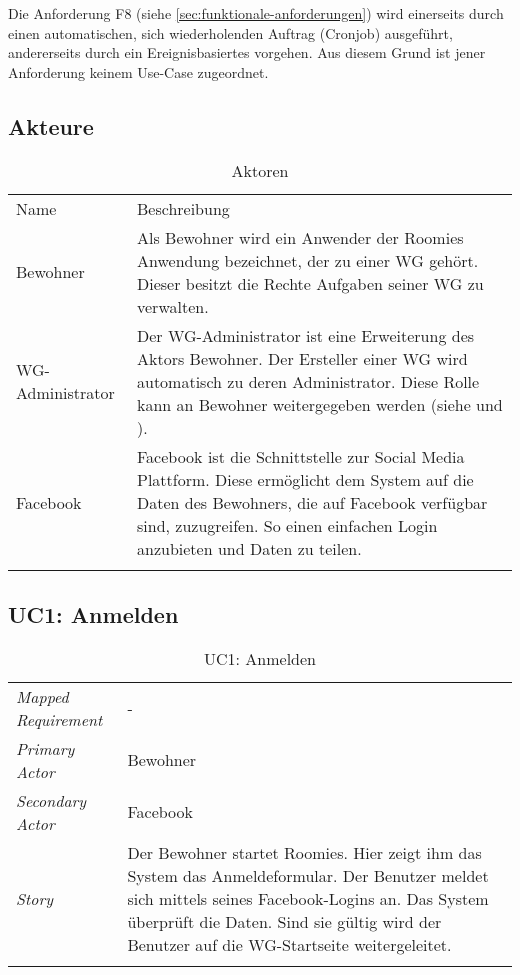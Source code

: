 Die Anforderung F8 (siehe \ref{sec:funktionale-anforderungen}) wird einerseits durch einen automatischen, sich wiederholenden Auftrag (\gls{Cronjob}) ausgeführt, andererseits durch ein Ereignisbasiertes vorgehen. Aus diesem Grund ist jener Anforderung keinem Use-Case zugeordnet.

\subsection{Akteure}
\begin{table}[H]
	\tablestyle
	\tablealtcolored
	\begin{tabularx}{\textwidth}{lX}
		\tableheadcolor
		\tablehead Name &
		\tablehead Beschreibung \tabularnewline
		\tablebody
			Bewohner &
			Als Bewohner wird ein Anwender der Roomies Anwendung bezeichnet, der zu einer WG gehört. \newline
			Dieser besitzt die Rechte Aufgaben seiner WG zu verwalten.
			\tabularnewline
			WG-Administrator &
			Der WG-Administrator ist eine Erweiterung des Aktors Bewohner. Der Ersteller einer WG wird automatisch zu deren Administrator. Diese Rolle kann an Bewohner weitergegeben werden (siehe \nameref{subsec:uc4} und \nameref{subsec:uc10}).
			\tabularnewline
			Facebook &
			Facebook ist die Schnittstelle zur Social Media Plattform. Diese ermöglicht dem System auf die Daten des Bewohners, die auf Facebook verfügbar sind, zuzugreifen. So einen einfachen Login anzubieten und Daten zu teilen.
			\tabularnewline
		\tableend
	\end{tabularx}
	\caption{Aktoren}
\end{table}

\subsection{UC1: Anmelden}\label{subsec:uc1}
\begin{table}[H]
	\tablestyle
	\tablealtcolored
	\begin{tabularx}{\textwidth}{lX}
		\tablebody
			\textit{Mapped Requirement} &
			-
			\tabularnewline
			\textit{Primary Actor} &
			Bewohner
			\tabularnewline
			\textit{Secondary Actor} &
			Facebook
			\tabularnewline
			\textit{Story} &
			Der Bewohner startet Roomies. Hier zeigt ihm das System das Anmeldeformular. Der Benutzer meldet sich mittels seines Facebook-Logins an. Das System überprüft die Daten. Sind sie gültig wird der Benutzer auf die WG-Startseite weitergeleitet.
			\tabularnewline
		\tableend
	\end{tabularx}
	\caption{UC1: Anmelden}
\end{table}



